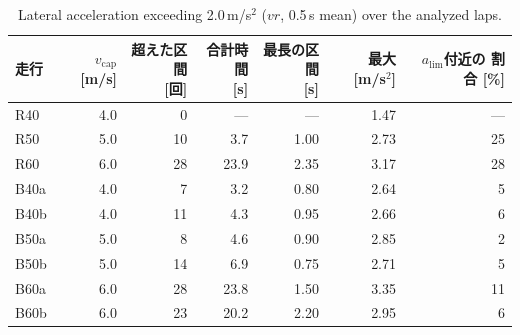 \begin{table}[!htbp]
  \centering
  \caption[Lateral acceleration exceeding the upper limit of the speed planning.]{Lateral acceleration exceeding 2.0\,m/s$^2$ ($vr$, 0.5\,s mean) over the analyzed laps.}
  \label{tab:ay}
  \small
  \begin{lrbox}{\tblbox}\setlength{\tabcolsep}{4pt}\begin{tabular}{lrrrrrr}
    \toprule
    走行 & \shortstack[r]{$v_{\mathrm{cap}}$\\{[m/s]}} & \shortstack[r]{超えた区間\\{[回]}} & \shortstack[r]{合計時間\\{[s]}} & \shortstack[r]{最長の区間\\{[s]}} & \shortstack[r]{最大\\{[m/s$^2$]}} & \shortstack[r]{$a_{\mathrm{lim}}$付近の\\割合 {[\%]}} \\
    \midrule
    R40 & 4.0 & 0 & --- & --- & 1.47 & --- \\
    R50 & 5.0 & 10 & 3.7 & 1.00 & 2.73 & 25 \\
    R60 & 6.0 & 28 & 23.9 & 2.35 & 3.17 & 28 \\
    B40a & 4.0 & 7 & 3.2 & 0.80 & 2.64 & 5 \\
    B40b & 4.0 & 11 & 4.3 & 0.95 & 2.66 & 6 \\
    B50a & 5.0 & 8 & 4.6 & 0.90 & 2.85 & 2 \\
    B50b & 5.0 & 14 & 6.9 & 0.75 & 2.71 & 5 \\
    B60a & 6.0 & 28 & 23.8 & 1.50 & 3.35 & 11 \\
    B60b & 6.0 & 23 & 20.2 & 2.20 & 2.95 & 6 \\
    \bottomrule
  \end{tabular}\end{lrbox}\usebox{\tblbox}
\end{table}

